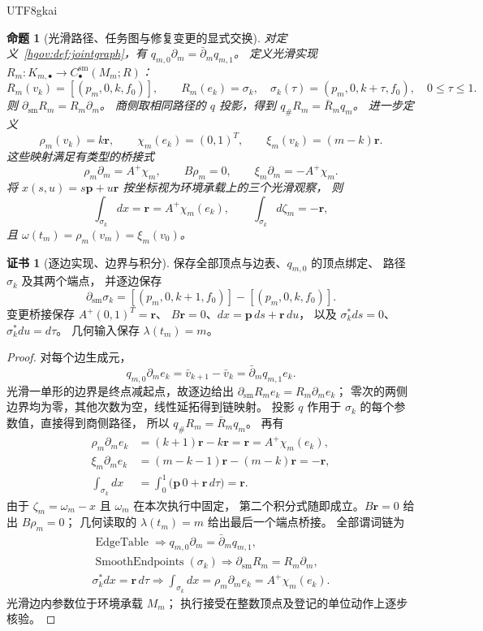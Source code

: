 \documentclass[12pt,a4paper,openany,notitlepage]{report}
\theoremstyle{plain}
\newtheorem{proposition}[theorem]{命题}
\theoremstyle{definition}
\newtheorem*{certificate}{证书}
\theoremstyle{remark}
\def\mathcal#1{#1}\def\mathsf#1{#1}\def\mathbb#1{#1}%
\begin{document}
\begin{CJK*}{UTF8}{gkai}
\begin{proposition}[光滑路径、任务图与修复变更的显式交换]
\label{hgov:prop:jointgraph}
对定义~\ref{hgov:def:jointgraph}，有
$q_{m,0}\partial_m=\bar\partial_mq_{m,1}$。
定义光滑实现 $\mathcal R_m:K_{m,\bullet}\to
C_\bullet^{\mathrm{sm}}(M_m;\mathbb R)$：
\[
 \mathcal R_m(v_k)=[(p_m,0,k,f_0)],\qquad
 \mathcal R_m(e_k)=\sigma_k,\quad
 \sigma_k(\tau)=(p_m,0,k+\tau,f_0),\quad 0\le\tau\le1.
\]
则 $\partial_{\mathrm{sm}}\mathcal R_m=\mathcal R_m\partial_m$。
商侧取相同路径的 $q$ 投影，得到
$q_\#\mathcal R_m=\bar{\mathcal R}_mq_m$。
进一步定义
\[
 \rho_m(v_k)=k\mathbf r,\qquad
 \chi_m(e_k)=(0,1)^{\mathsf T},\qquad
 \xi_m(v_k)=(m-k)\mathbf r.
\]
这些映射满足有类型的桥接式
\[
 \rho_m\partial_m=A^+\chi_m,\qquad
 B\rho_m=0,\qquad
 \xi_m\partial_m=-A^+\chi_m.
\]
将 $x(s,u)=s\mathbf p+u\mathbf r$ 按坐标视为环境承载上的三个光滑观察，
则
\[
 \int_{\sigma_k}dx=\mathbf r=A^+\chi_m(e_k),\qquad
 \int_{\sigma_k}d\zeta_m=-\mathbf r,
\]
且 $\omega(t_m)=\rho_m(v_m)=\xi_m(v_0)$。
\end{proposition}
\begin{certificate}[逐边实现、边界与积分]
保存全部顶点与边表、$q_{m,0}$ 的顶点绑定、
路径 $\sigma_k$ 及其两个端点，
并逐边保存
\[
 \partial_{\mathrm{sm}}\sigma_k
 =[(p_m,0,k+1,f_0)]-[(p_m,0,k,f_0)].
\]
变更桥接保存 $A^+(0,1)^{\mathsf T}=\mathbf r$、
$B\mathbf r=0$、$dx=\mathbf p\,ds+\mathbf r\,du$，
以及 $\sigma_k^*ds=0$、$\sigma_k^*du=d\tau$。
几何输入保存 $\lambda(t_m)=m$。
\end{certificate}
\begin{proof}
对每个边生成元，
\[
 q_{m,0}\partial_me_k
 =\bar v_{k+1}-\bar v_k
 =\bar\partial_mq_{m,1}e_k.
\]
光滑一单形的边界是终点减起点，故逐边给出
$\partial_{\mathrm{sm}}\mathcal R_me_k
=\mathcal R_m\partial_me_k$；
零次的两侧边界均为零，其他次数为空，线性延拓得到链映射。
投影 $q$ 作用于 $\sigma_k$ 的每个参数值，直接得到商侧路径，
所以 $q_\#\mathcal R_m=\bar{\mathcal R}_mq_m$。
再有
\[
 \begin{aligned}
 \rho_m\partial_me_k
 &=(k+1)\mathbf r-k\mathbf r
 =\mathbf r=A^+\chi_m(e_k),\\
 \xi_m\partial_me_k
 &=(m-k-1)\mathbf r-(m-k)\mathbf r
 =-\mathbf r,\\
 \int_{\sigma_k}dx
 &=\int_0^1\bigl(\mathbf p\,0+\mathbf r\,d\tau\bigr)
 =\mathbf r.
 \end{aligned}
\]
由于 $\zeta_m=\omega_m-x$ 且 $\omega_m$ 在本次执行中固定，
第二个积分式随即成立。$B\mathbf r=0$ 给出 $B\rho_m=0$；
几何读取的 $\lambda(t_m)=m$ 给出最后一个端点桥接。
全部谓词链为
\[
 \begin{gathered}
 \operatorname{EdgeTable}
 \Longrightarrow q_{m,0}\partial_m=\bar\partial_mq_{m,1},\\
 \operatorname{SmoothEndpoints}(\sigma_k)
 \Longrightarrow
 \partial_{\mathrm{sm}}\mathcal R_m=\mathcal R_m\partial_m,\\
 \sigma_k^*dx=\mathbf r\,d\tau
 \Longrightarrow
 \int_{\sigma_k}dx=\rho_m\partial_me_k=A^+\chi_m(e_k).
 \end{gathered}
\]
光滑边内参数位于环境承载 $M_m$；
执行接受在整数顶点及登记的单位动作上逐步核验。
\end{proof}


\end{CJK*}
\end{document}
